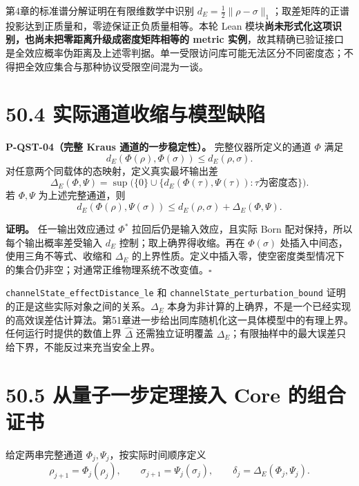 \documentclass[
  11pt,
  oneside]{book}
\begin{document}
第4章的标准谱分解证明在有限维数学中识别
\(d_E=\tfrac12\|\rho-\sigma\|_1\)；取差矩阵的正谱投影达到正质量和，零迹保证正负质量相等。本轮
Lean 模块\textbf{尚未形式化这项识别，也尚未把零距离升级成密度矩阵相等的
metric
实例}，故其精确已验证接口是全效应概率伪距离及上述零判据。单一受限访问库可能无法区分不同密度态；不得把全效应集合与那种协议受限空间混为一谈。

\hypertarget{ux5b9eux9645ux901aux9053ux6536ux7f29ux4e0eux6a21ux578bux7f3aux9677}{%
\section{50.4
实际通道收缩与模型缺陷}\label{ux5b9eux9645ux901aux9053ux6536ux7f29ux4e0eux6a21ux578bux7f3aux9677}}

\protect\hypertarget{p-qst-04}{}{}

\textbf{P-QST-04（完整 Kraus 通道的一步稳定性）。} 完整仪器所定义的通道
\(\Phi\) 满足 \[
d_E(\Phi(\rho),\Phi(\sigma))\le d_E(\rho,\sigma).
\] 对任意两个同载体的态映射，定义真实最坏输出差 \[
\Delta_E(\Phi,\Psi)=\sup\bigl(\{0\}\cup
\{d_E(\Phi(\tau),\Psi(\tau)):\tau\text{为密度态}\}\bigr).
\] 若 \(\Phi,\Psi\) 为上述完整通道，则 \[
d_E(\Phi(\rho),\Psi(\sigma))
\le d_E(\rho,\sigma)+\Delta_E(\Phi,\Psi).
\]

\textbf{证明。} 任一输出效应通过 \(\Phi^*\) 拉回后仍是输入效应，且实际
Born 配对保持，所以每个输出概率差受输入 \(d_E\)
控制；取上确界得收缩。再在 \(\Phi(\sigma)\)
处插入中间态，使用三角不等式、收缩和 \(\Delta_E\)
的上界性质。定义中插入零，使空密度类型情况下的集合仍非空；对通常正维物理系统不改变值。\(\square\)

\texttt{channelState\_\allowbreak effectDistance\_\allowbreak le} 和
\texttt{channelState\_\allowbreak perturbation\_\allowbreak bound}
证明的正是这些实际对象之间的关系。\(\Delta_E\)
本身为非计算的上确界，不是一个已经实现的高效误差估计算法。第51章进一步给出同库随机化这一具体模型中的有理上界。任何运行时提供的数值上界
\(\widehat\Delta\) 还需独立证明覆盖
\(\Delta_E\)；有限抽样中的最大误差只给下界，不能反过来充当安全上界。

\hypertarget{ux4eceux91cfux5b50ux4e00ux6b65ux5b9aux7406ux63a5ux5165-core-ux7684ux7ec4ux5408ux8bc1ux4e66}{%
\section{50.5 从量子一步定理接入 Core
的组合证书}\label{ux4eceux91cfux5b50ux4e00ux6b65ux5b9aux7406ux63a5ux5165-core-ux7684ux7ec4ux5408ux8bc1ux4e66}}

给定两串完整通道 \(\Phi_j,\Psi_j\)，按实际时间顺序定义 \[
\rho_{j+1}=\Phi_j(\rho_j),\qquad
\sigma_{j+1}=\Psi_j(\sigma_j),\qquad
\delta_j=\Delta_E(\Phi_j,\Psi_j).
\]
\end{document}
